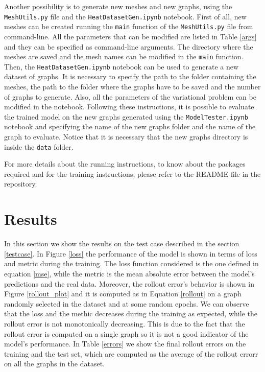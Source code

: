\documentclass[11pt,a4paper]{article}
\begin{document}
Another possibility is to generate new meshes and new graphs, using the \texttt{MeshUtils.py} file and the \texttt{HeatDatasetGen.ipynb} notebook. 
First of all, new meshes can be created running the \texttt{main} function of the \texttt{MeshUtils.py} file from command-line. All the parameters that can be modified are listed in Table \ref{args} and they can be specified as command-line arguments. The directory where the meshes are saved and the mesh names can be modified in the \texttt{main} function. 
Then, the \texttt{HeatDatasetGen.ipynb} notebook can be used to generate a new dataset of graphs. It is necessary to specify the path to the folder containing the meshes, the path to the folder where the graphs have to be saved and the number of graphs to generate. Also, all the parameters of the variational problem can be modified in the notebook. 
Following these instructions, it is possible to evaluate the trained model on the new graphs generated using the \texttt{ModelTester.ipynb} notebook and specifying the name of the new graphs folder and the name of the graph to evaluate. Notice that it is necessary that the new graphs directory is inside the \texttt{data} folder.

For more details about the running instructions, to know about the packages required and for the training instructions, please refer to the README file in the repository.


\section{Results}
\label{results}
In this section we show the results on the test case described in the section \ref{testcase}. 
In Figure \ref{loss} the performance of the model is shown in terms of loss and metric during the training. 
The loss function considered is the one defined in equation \ref{mse}, while the metric is the mean absolute error between the model's predictions and the real data. 
Moreover, the rollout error's behavior is shown in Figure \ref{rollout_plot} and it is computed as in Equation \ref{rollout} on a graph randomly selected in the dataset and at some random epochs. We can observe that the loss and the methic decreases during the training as expected, while the rollout error is not monotonically decreasing. This is due to the fact that the rollout error is computed on a single graph so it is not a good indicator of the model's performance.
In Table \ref{errors} we show the final rollout errors on the training and the test set, which are computed as the average of the rollout errorr on all the graphs in the dataset.
\end{document}
